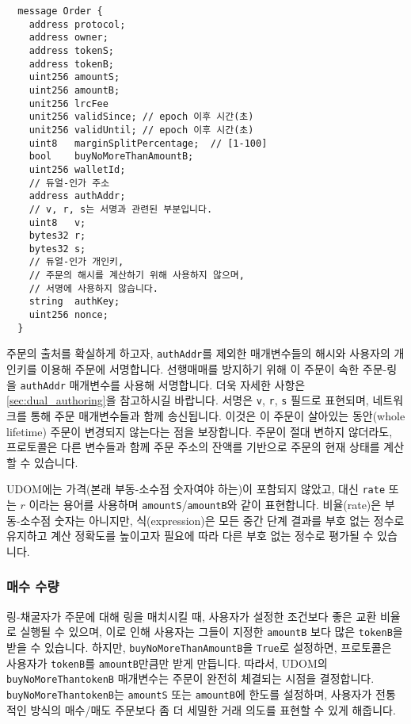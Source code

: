 \documentclass[UTF8,nofonts]{article}
\begin{document}
\begin{multicols}{2}
\begin{verbatim}
  message Order {
    address protocol;
    address owner;
    address tokenS;
    address tokenB;
    uint256 amountS;
    uint256 amountB;
    unit256 lrcFee
    unit256 validSince; // epoch 이후 시간(초)
    unit256 validUntil; // epoch 이후 시간(초)
    uint8   marginSplitPercentage;  // [1-100]
    bool    buyNoMoreThanAmountB;
    uint256 walletId;
    // 듀얼-인가 주소
    address authAddr;
   	// v, r, s는 서명과 관련된 부분입니다.
    uint8   v;       
    bytes32 r;
    bytes32 s;
    // 듀얼-인가 개인키,
    // 주문의 해시를 계산하기 위해 사용하지 않으며,
    // 서명에 사용하지 않습니다.
    string  authKey;          
    uint256 nonce;
  }
\end{verbatim}

주문의 출처를 확실하게 하고자, \verb|authAddr|를 제외한 매개변수들의 해시와 사용자의 개인키를 이용해 주문에 서명합니다. 선행매매를 방지하기 위해 이 주문이 속한 주문-링을 \verb|authAddr| 매개변수를 사용해 서명합니다. 더욱 자세한 사항은 \ref{sec:dual_authoring}을 참고하시길 바랍니다. 서명은 \verb|v|, \verb|r|, \verb|s| 필드로 표현되며, 네트워크를 통해 주문 매개변수들과 함께 송신됩니다. 이것은 이 주문이 살아있는 동안(whole lifetime) 주문이 변경되지 않는다는 점을 보장합니다. 주문이 절대 변하지 않더라도, 프로토콜은 다른 변수들과 함께 주문 주소의 잔액를 기반으로 주문의 현재 상태를 계산할 수 있습니다. 

UDOM에는 가격(본래 부동-소수점 숫자여야 하는)이 포함되지 않았고, 대신 \verb|rate| 또는 $r$ 이라는 용어를 사용하며 \verb|amountS|/\verb|amountB|와 같이 표현합니다. 비율(rate)은 부동-소수점 숫자는 아니지만, 식(expression)은 모든 중간 단계 결과를 부호 없는 정수로 유지하고 계산 정확도를 높이고자 필요에 따라 다른 부호 없는 정수로 평가될 수 있습니다.    
 
\subsubsection{매수 수량}

링-채굴자가 주문에 대해 링을 매치시킬 때, 사용자가 설정한 조건보다 좋은 교환 비율로 실행될 수 있으며, 이로 인해 사용자는 그들이 지정한 \verb|amountB| 보다 많은 \verb|tokenB|을 받을 수 있습니다. 하지만, \verb|buyNoMoreThanAmountB|을 \verb|True|로 설정하면, 프로토콜은 사용자가 \verb|tokenB|를 \verb|amountB|만큼만 받게 만듭니다. 따라서, UDOM의 \verb|buyNoMoreThantokenB| 매개변수는 주문이 완전히 체결되는 시점을 결정합니다. \verb|buyNoMoreThantokenB|는 \verb|amountS| 또는 \verb|amountB|에 한도를 설정하며, 사용자가 전통적인 방식의 매수/매도 주문보다 좀 더 세밀한 거래 의도를 표현할 수 있게 해줍니다.    


\end{multicols}
\end{document}
